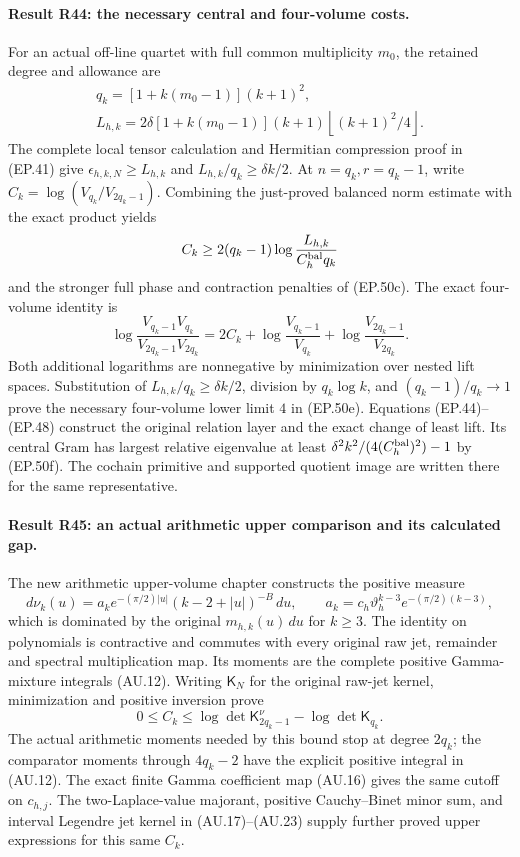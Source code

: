 \paragraph{Result R44: the necessary central and four-volume costs.}
For an actual off-line quartet with full common multiplicity $m_0$,
the retained degree and allowance are
\begin{gather*}
 q_k=[1+k(m_0-1)](k+1)^2,\\
 L_{h,k}=2\delta[1+k(m_0-1)](k+1)
                \left\lfloor (k+1)^2/4\right\rfloor.
\end{gather*}
The complete local tensor calculation and Hermitian compression
proof in (EP.41) give $\epsilon_{h,k,N}\ge L_{h,k}$ and
$L_{h,k}/q_k\ge\delta k/2$. At $n=q_k,r=q_k-1$, write
$C_k=\log(V_{q_k}/V_{2q_k-1})$. Combining the just-proved
balanced norm estimate with the exact product yields
\[
 C_k\ge2(q_k-1)\log\frac{L_{h,k}}{C_h^{\rm bal}q_k}
\]
and the stronger full phase and contraction penalties of (EP.50c).
The exact four-volume identity is
\[
 \log\frac{V_{q_k-1}V_{q_k}}{V_{2q_k-1}V_{2q_k}}
 =2C_k+\log\frac{V_{q_k-1}}{V_{q_k}}
          +\log\frac{V_{2q_k-1}}{V_{2q_k}}.
\]
Both additional logarithms are nonnegative by minimization over
nested lift spaces. Substitution of $L_{h,k}/q_k\ge\delta k/2$,
division by $q_k\log k$, and $(q_k-1)/q_k\to1$ prove the
necessary four-volume lower limit $4$ in (EP.50e).
Equations (EP.44)--(EP.48) construct the original relation layer
and the exact change of least lift. Its central Gram has largest
relative eigenvalue at least
$\delta^2k^2/(4(C_h^{\rm bal})^2)-1$ by (EP.50f).
The cochain primitive and supported quotient image are written
there for the same representative.

\paragraph{Result R45: an actual arithmetic upper comparison and its calculated gap.}
The new arithmetic upper-volume chapter constructs the positive
measure
\[
 d\nu_k(u)=a_k e^{-(\pi/2)|u|}(k-2+|u|)^{-B}\,du,
 \qquad a_k=c_h\vartheta_h^{k-3}e^{-(\pi/2)(k-3)},
\]
which is dominated by the original $m_{h,k}(u)\,du$ for $k\ge3$.
The identity on polynomials is contractive and commutes with every
original raw jet, remainder and spectral multiplication map.
Its moments are the complete positive Gamma-mixture integrals
(AU.12). Writing $\mathsf K_N$ for the original raw-jet kernel,
minimization and positive inversion prove
\[
 0\le C_k\le
 \log\det\mathsf K_{2q_k-1}^{\nu}
       -\log\det\mathsf K_{q_k}.
\]
The actual arithmetic moments needed by this bound stop at degree
$2q_k$; the comparator moments through $4q_k-2$ have the explicit
positive integral in (AU.12). The exact finite Gamma coefficient
map (AU.16) gives the same cutoff on $c_{h,j}$.
The two-Laplace-value majorant, positive Cauchy--Binet minor sum,
and interval Legendre jet kernel in (AU.17)--(AU.23) supply
further proved upper expressions for this same $C_k$.


